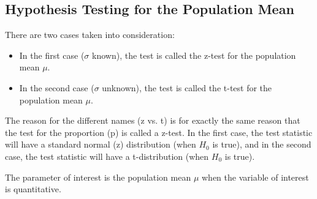 \documentclass[10pt, a4paper]{article}
\begin{document}
\subsection{Hypothesis Testing for the Population Mean}
There are two cases taken into consideration:
\begin{itemize}
\item In the first case ($\sigma$ known), the test is called the z-test for the population mean $\mu$.
\item In the second case ($\sigma$ unknown), the test is called the t-test for the population mean $\mu$.
\end{itemize}
The reason for the different names (z vs. t) is for exactly the same reason that the test for the proportion (p) is called a z-test. In the first case, the test statistic will have a standard normal (z) distribution (when $H_0$ is true), and in the second case, the test statistic will have a t-distribution (when $H_0$ is true).\par
The parameter of interest is the population mean $\mu$ when the variable of interest is quantitative.
\end{document}

